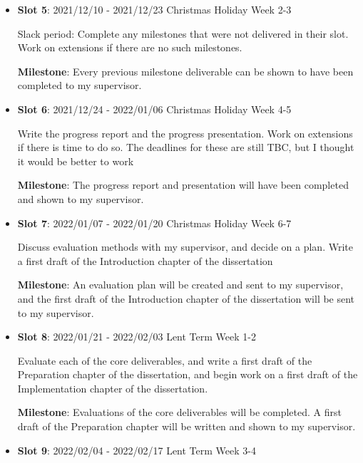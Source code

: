 \documentclass[12pt]{article}
\begin{document}
\begin{itemize}
\item
  \textbf{Slot 5}: 2021/12/10 - 2021/12/23 \hspace*{\fill}Christmas Holiday Week 2-3

Slack period: Complete any milestones that were not delivered in their slot. Work on extensions if there are no such milestones.

\textbf{Milestone}: Every previous milestone deliverable can be shown to have been completed to my supervisor.

\item
  \textbf{Slot 6}: 2021/12/24 - 2022/01/06 \hspace*{\fill}Christmas Holiday Week 4-5

Write the progress report and the progress presentation. Work on extensions if there is time to do so. The deadlines for these are still TBC, but I thought it would be better to work

\textbf{Milestone}: The progress report and presentation will have been completed and shown to my supervisor.

\item

  \textbf{Slot 7}: 2022/01/07 - 2022/01/20 \hspace*{\fill}Christmas Holiday Week 6-7

Discuss evaluation methods with my supervisor, and decide on a plan. Write a first draft of the Introduction chapter of the dissertation

\textbf{Milestone}: An evaluation plan will be created and sent to my supervisor, and the first draft of the Introduction chapter of the dissertation will be sent to my supervisor.

\item

  \textbf{Slot 8}: 2022/01/21 - 2022/02/03 \hspace*{\fill} Lent Term Week 1-2

Evaluate each of the core deliverables, and write a first draft of the Preparation chapter of the dissertation, and begin work on a first draft of the Implementation chapter of the dissertation.

\textbf{Milestone}: Evaluations of the core deliverables will be completed. A first draft of the Preparation chapter will be written and shown to my supervisor.

\item
  \textbf{Slot 9}: 2022/02/04 - 2022/02/17 \hspace*{\fill}Lent Term Week 3-4


\end{itemize}
\end{document}

